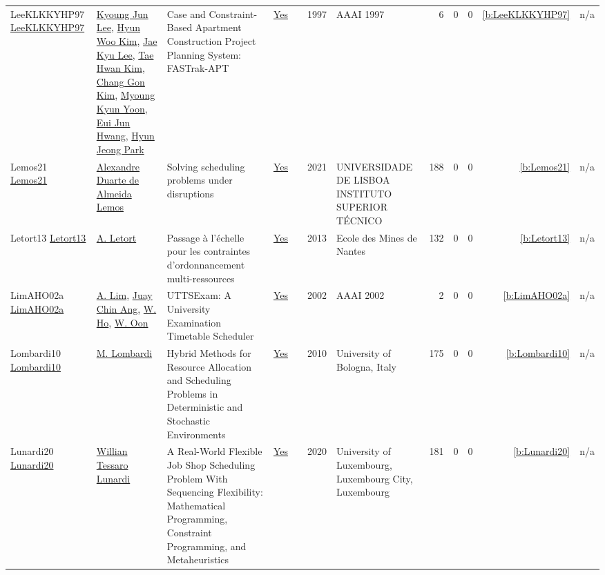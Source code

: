 {\begin{longtable}{>{\raggedright\arraybackslash}p{3cm}>{\raggedright\arraybackslash}p{6cm}>{\raggedright\arraybackslash}p{6.5cm}rrrp{2.5cm}rrrrr}
LeeKLKKYHP97 \href{http://www.aaai.org/Library/IAAI/1997/iaai97-182.php}{LeeKLKKYHP97} & \hyperref[auth:a1326]{Kyoung Jun Lee}, \hyperref[auth:a1327]{Hyun Woo Kim}, \hyperref[auth:a1328]{Jae Kyu Lee}, \hyperref[auth:a1329]{Tae Hwan Kim}, \hyperref[auth:a1330]{Chang Gon Kim}, \hyperref[auth:a1331]{Myoung Kyun Yoon}, \hyperref[auth:a1332]{Eui Jun Hwang}, \hyperref[auth:a1333]{Hyun Jeong Park} & Case and Constraint-Based Apartment Construction Project Planning System: FASTrak-APT & \href{../works/LeeKLKKYHP97.pdf}{Yes} & \cite{LeeKLKKYHP97} & 1997 & AAAI 1997 & 6 & 0 & 0 & \ref{b:LeeKLKKYHP97} & n/a\\
Lemos21 \href{https://scholar.tecnico.ulisboa.pt/records/u5RPHM-pu_yoOLXJF7BHrgJx47D827b0xHb3}{Lemos21} & \hyperref[auth:a883]{Alexandre Duarte {de Almeida} Lemos} & Solving scheduling problems under disruptions & \href{../works/Lemos21.pdf}{Yes} & \cite{Lemos21} & 2021 & UNIVERSIDADE DE LISBOA INSTITUTO SUPERIOR TÉCNICO & 188 & 0 & 0 & \ref{b:Lemos21} & n/a\\
Letort13 \href{https://theses.hal.science/tel-00932215}{Letort13} & \hyperref[auth:a128]{A. Letort} & {Passage {\`a} l'{\'e}chelle pour les contraintes d'ordonnancement multi-ressources} & \href{../works/Letort13.pdf}{Yes} & \cite{Letort13} & 2013 & {Ecole des Mines de Nantes} & 132 & 0 & 0 & \ref{b:Letort13} & n/a\\
LimAHO02a \href{http://www.aaai.org/Library/AAAI/2002/aaai02-175.php}{LimAHO02a} & \hyperref[auth:a281]{A. Lim}, \hyperref[auth:a1357]{Juay Chin Ang}, \hyperref[auth:a1358]{W. Ho}, \hyperref[auth:a1359]{W. Oon} & UTTSExam: {A} University Examination Timetable Scheduler & \href{../works/LimAHO02a.pdf}{Yes} & \cite{LimAHO02a} & 2002 & AAAI 2002 & 2 & 0 & 0 & \ref{b:LimAHO02a} & n/a\\
Lombardi10 \href{http://amsdottorato.unibo.it/2961/}{Lombardi10} & \hyperref[auth:a143]{M. Lombardi} & Hybrid Methods for Resource Allocation and Scheduling Problems in Deterministic and Stochastic Environments & \href{../works/Lombardi10.pdf}{Yes} & \cite{Lombardi10} & 2010 & University of Bologna, Italy & 175 & 0 & 0 & \ref{b:Lombardi10} & n/a\\
Lunardi20 \href{http://orbilu.uni.lu/handle/10993/43893}{Lunardi20} & \hyperref[auth:a499]{Willian Tessaro Lunardi} & A Real-World Flexible Job Shop Scheduling Problem With Sequencing Flexibility: Mathematical Programming, Constraint Programming, and Metaheuristics & \href{../works/Lunardi20.pdf}{Yes} & \cite{Lunardi20} & 2020 & University of Luxembourg, Luxembourg City, Luxembourg & 181 & 0 & 0 & \ref{b:Lunardi20} & n/a\\

\end{longtable}}
